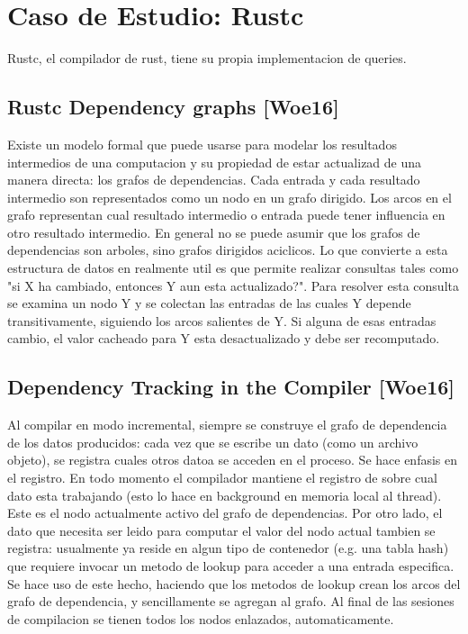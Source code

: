 \documentclass[12pt, a4paper]{report}
\begin{document}
\chapter*{Caso de Estudio: Rustc}

Rustc, el compilador de rust, tiene su propia implementacion de queries.

\section*{Rustc Dependency graphs [Woe16]}

Existe un modelo formal que puede usarse para modelar los resultados intermedios de una computacion y su propiedad de estar actualizad de una manera directa: los grafos de dependencias.
Cada entrada y cada resultado intermedio son representados como un nodo en un grafo dirigido.
Los arcos en el grafo representan cual resultado intermedio o entrada puede tener influencia en otro resultado intermedio.
En general no se puede asumir que los grafos de dependencias son arboles, sino grafos dirigidos aciclicos.
Lo que convierte a esta estructura de datos en realmente util es que permite realizar consultas tales como "si X ha cambiado, entonces Y aun esta actualizado?".
Para resolver esta consulta se examina un nodo Y y se colectan las entradas de las cuales Y depende transitivamente, siguiendo los arcos salientes de Y.
Si alguna de esas entradas cambio, el valor cacheado para Y esta desactualizado y debe ser recomputado.
\cite{rust_blog_incremental_compilation}

\section*{Dependency Tracking in the Compiler [Woe16]}

Al compilar en modo incremental, siempre se construye el grafo de dependencia de los datos producidos: cada vez que se escribe un dato (como un archivo objeto), se registra cuales otros datoa se acceden en el proceso.
Se hace enfasis en el registro. En todo momento el compilador mantiene el registro de sobre cual dato esta trabajando (esto lo hace en background en memoria local al thread).
Este es el nodo actualmente activo del grafo de dependencias.
Por otro lado, el dato que necesita ser leido para computar el valor del nodo actual tambien se registra: usualmente ya reside en algun tipo de contenedor (e.g. una tabla hash) que requiere invocar un metodo de lookup para acceder a una entrada especifica.
Se hace uso de este hecho, haciendo que los metodos de lookup crean los arcos del grafo de dependencia, y sencillamente se agregan al grafo.
Al final de las sesiones de compilacion se tienen todos los nodos enlazados, automaticamente.
\cite{rust_blog_incremental_compilation}
\end{document}
